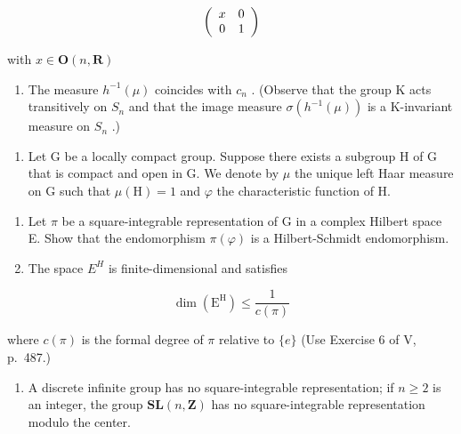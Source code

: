\[
\left( \begin{array}{c c} x & 0 \\ 0 & 1 \end{array} \right)
\]

with \(x\in \mathbf{O}(n,\mathbf{R})\)

\begin{enumerate}
\def\labelenumi{\alph{enumi})}
\setcounter{enumi}{7}
\tightlist
\item
  The measure \(h^{-1}(\mu)\) coincides with \(c_{n}\) . (Observe that the group K acts transitively on \(S_{n}\) and that the image measure \(\sigma(h^{-1}(\mu))\) is a K-invariant measure on \(S_{n}\) .)
\end{enumerate}

\begin{enumerate}
\def\labelenumi{\arabic{enumi})}
\setcounter{enumi}{31}
\tightlist
\item
  Let G be a locally compact group. Suppose there exists a subgroup H of G that is compact and open in G. We denote by \(\mu\) the unique left Haar measure on G such that \(\mu(\mathrm{H}) = 1\) and \(\varphi\) the characteristic function of H.
\end{enumerate}

\begin{enumerate}
\def\labelenumi{\alph{enumi})}
\item
  Let \(\pi\) be a square-integrable representation of G in a complex Hilbert space E. Show that the endomorphism \(\pi(\varphi)\) is a Hilbert-Schmidt endomorphism.
\item
  The space \(E^{H}\) is finite-dimensional and satisfies
\end{enumerate}

\[
\dim (\mathrm{E} ^ {\mathrm{H}}) \leqslant \frac {1}{c (\pi)}
\]

where \(c(\pi)\) is the formal degree of \(\pi\) relative to \(\{e\}\) (Use Exercise 6 of V, p.~487.)

\begin{enumerate}
\def\labelenumi{\alph{enumi})}
\setcounter{enumi}{2}
\tightlist
\item
  A discrete infinite group has no square-integrable representation; if \(n \geqslant 2\) is an integer, the group \(\mathbf{SL}(n, \mathbf{Z})\) has no square-integrable representation modulo the center.
\end{enumerate}

